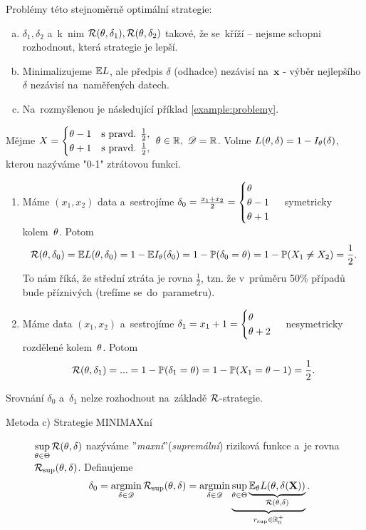 \begin{description}
	Problémy této stejnoměrně optimální strategie: \begin{enumerate}[a)]
		\item $\delta_1,\delta_2$ a~k~nim $\mathcal{R}(\theta,\delta_1),\mathcal{R}(\theta,\delta_2)$ takové, že se~kříží -- nejsme schopni rozhodnout, která strategie je lepší.
		\item Minimalizujeme $\mathbb{E} L$, ale předpis $\delta$ (odhadce) nezávisí na~$\textbf{x}$ - výběr nejlepšího $\delta$ nezávisí na~naměřených datech.
		\item Na~rozmyšlenou je následující příklad \ref{example:problemy}.
	\end{enumerate}
\end{description}

\begin{example} \label{example:problemy}
	Mějme $X=\begin{cases}
	\theta-1 & \text{s pravd. } \frac{1}{2}, \\ \theta+1 & \text{s pravd. } \frac{1}{2},
	\end{cases}~\theta\in\mathbb{R},~\mathscr{D}=\mathbb{R}$. Volme
	$ L(\theta,\delta)=1-I_\theta(\delta)$, kterou nazýváme "0-1" ztrátovou funkci.
	
	\begin{enumerate}[1)]
		\item Máme $(x_1,x_2)$ data a~sestrojíme $\delta_0=\frac{x_1+x_2}{2}=\begin{cases}
		\theta\\\theta-1\\\theta+1
		\end{cases}$ symetricky kolem~$\theta$. Potom
		$$ \mathcal{R}(\theta,\delta_0)=\mathbb{E} L(\theta,\delta_0)=1-\mathbb{E} I_\theta(\delta_0)=1-\mathbb{P}(\delta_0=\theta)=1-\mathbb{P}(X_1\neq X_2)=\frac{1}{2}.$$ To nám říká, že střední ztráta je rovna $\frac{1}{2}$, tzn. že v~průměru 50\% případů bude příznivých (trefíme se~do~parametru).
		\item Máme data $(x_1,x_2)$ a~sestrojíme $\delta_1=x_1+1=\begin{cases}
		\theta\\\theta+2
		\end{cases}$ nesymetricky rozdělené kolem~$\theta$. Potom
		$$\mathcal{R}(\theta,\delta_1)=...=1-\mathbb{P}(\delta_1=\theta)=1-\mathbb{P}(X_1=\theta-1)=\frac{1}{2}.$$
	\end{enumerate}
	Srovnání $\delta_0$ a~$\delta_1$ nelze rozhodnout na~základě $\mathcal{R}$-strategie. 
\end{example}
\begin{description}
	\item[Metoda c) Strategie MINIMAXní] $\sup\limits_{\theta\in\Theta} \mathcal{R}(\theta,\delta)$ nazýváme ''\textit{maxní}''(\textit{supremální}) riziková funkce a~je rovna $\mathcal{R}_{\sup}(\theta,\delta)$. Definujeme 
	$$ \delta_0=\mathop{\mathrm{argmin}}\limits_{\delta\in\mathscr{D}}\mathcal{R}_{\sup}(\theta,\delta)=\mathop{\mathrm{argmin}}\limits_{\delta\in\mathscr{D}}\underbrace{\sup\limits_{\theta\in\Theta}\underbrace{\mathbb{E}_\theta L(\theta,\delta(\textbf{X}))}_{\mathcal{R}(\theta,\delta)}}_{r_{\sup}\in\mathbb{R}_0^+}.$$
\end{description}

